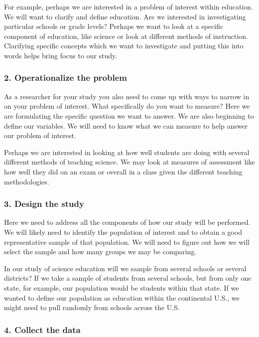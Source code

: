\documentclass[11pt, chapterprefix=true]{scrbook}\usepackage[]{graphicx}\usepackage[]{color}
\begin{document}
For example, perhaps we are interested in a problem of interest within education.  We will want to clarify and define education.  Are we interested in investigating particular schools or grade levels? Perhaps we want to look at a specific component of education, like science or look at different methods of instruction.   Clarifying specific concepts which we want to investigate and putting this into words helps bring focus to our study.

\subsubsection{2. Operationalize the problem}

As a researcher for your study you also need to come up with ways to narrow in on your problem of interest.  What specifically do you want to measure?  Here we are formulating the specific question we want to answer.  We are also beginning to define our variables.  We will need to know what we can measure to help answer our problem of interest.

Perhaps we are interested in looking at how well students are doing with several different methods of teaching science.  We may look at measures of assessment like how well they did on an exam or overall in a class given the different teaching methodologies.

\subsubsection{3. Design the study}

Here we need to address all the components of how our study will be performed.  We will likely need to identify the population of interest and to obtain a good representative sample of that population.  We will need to figure out how we will select the sample and how many groups we may be comparing.

In our study of science education will we sample from several schools or several districts?  If we take a sample of students from several schools, but from only one state, for example, our population would be students within that state.  If we wanted to define our population as education within the continental U.S., we might need to pull randomly from schools across the U.S.

\subsubsection{4. Collect the data}
\end{document}
